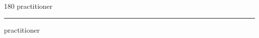 
\begin{frame}
\begin{center}
\begin{turn}{180}
{\fontsize{2.5cm}{1em}\selectfont practitioner}
\end{turn}
\vspace{1em}\par  
\hrule
\vspace{1em}\par  
{\fontsize{2.5cm}{1em}\selectfont practitioner}
\end{center}
\end{frame}
